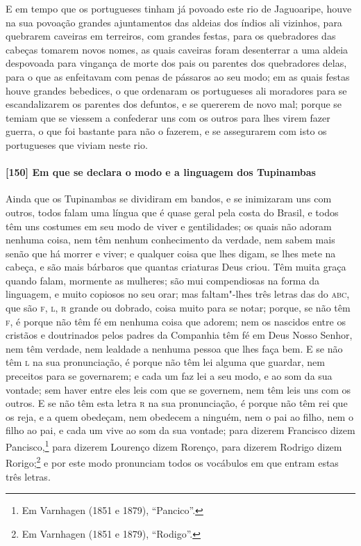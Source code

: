 \begin{linenumbers}
E em tempo que os portugueses tinham já povoado este rio de Jaguoaripe, houve na sua
povoação grandes ajuntamentos das aldeias dos índios ali vizinhos, para quebrarem caveiras
em terreiros, com grandes festas, para os quebradores das cabeças tomarem novos nomes, as
quais caveiras foram desenterrar a uma aldeia despovoada para vingança de morte dos pais
ou parentes dos quebradores delas, para o que as enfeitavam com penas de pássaros ao seu
modo; em as quais festas houve grandes bebedices, o que ordenaram os portugueses ali
moradores para se escandalizarem os parentes dos defuntos, e se quererem de novo mal;
porque se temiam que se viessem a confederar uns com os outros para lhes virem fazer
guerra, o que foi bastante para não o fazerem, e se assegurarem com isto os portugueses
que viviam neste rio.

\paragraph{[150] Em que se declara o modo e a linguagem dos Tupinambas}\quad
Ainda que os Tupinambas se dividiram em bandos, e se inimizaram uns com outros, todos
falam uma língua que é quase geral pela costa do Brasil, e todos têm uns costumes em seu
modo de viver e gentilidades; os quais não adoram nenhuma coisa, nem têm nenhum
conhecimento da verdade, nem sabem mais senão que há morrer e viver; e qualquer coisa que
lhes digam, se lhes mete na cabeça, e são mais bárbaros que quantas criaturas Deus criou.
Têm muita graça quando falam, mormente as mulheres; são mui compendiosas na forma da
linguagem, e muito copiosos no seu orar; mas faltam"-lhes três letras das do \textsc{abc},
que são \textsc{f, l, r} grande ou dobrado, coisa muito para se notar; porque, se não têm
\textsc{f}, é porque não têm fé em nenhuma coisa que adorem; nem os nascidos entre os
cristãos e doutrinados pelos padres da Companhia têm fé em Deus Nosso Senhor, nem têm
verdade, nem lealdade a nenhuma pessoa que lhes faça bem. E se não têm \textsc{l} na sua
pronunciação, é porque não têm lei alguma que guardar, nem preceitos para se governarem; e
cada um faz lei a seu modo, e ao som da sua vontade; sem haver entre eles leis com que se
governem, nem têm leis uns com os outros. E se não têm esta letra \textsc{r} na sua
pronunciação, é porque não têm rei que os reja, e a quem obedeçam, nem obedecem a ninguém,
nem o pai ao filho, nem o filho ao pai, e cada um vive ao som da sua vontade; para dizerem
Francisco dizem Pancisco,\footnote{ Em Varnhagen (1851 e 1879), ``Pancico''.} para dizerem
Lourenço dizem Rorenço, para dizerem Rodrigo dizem Rorigo;\footnote{ Em Varnhagen (1851 e
1879), ``Rodigo''.} e por este modo pronunciam todos os vocábulos em que entram estas
três letras.


\end{linenumbers}
